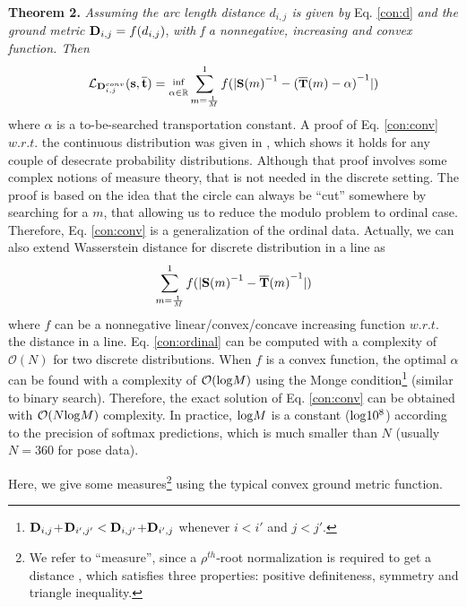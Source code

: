 \textbf{Theorem 2.} \textit{Assuming the arc length distance $d_{i,j}$ is given by} Eq. \eqref{con:d} \textit{and the ground metric} ${{\rm\textbf{D}}_{i,j}}=f(d_{i,j})$, \textit{with f a nonnegative, increasing and convex function. Then} \begin{equation}
\mathcal{L}_{{\rm\textbf{D}}^{conv}_{i,j}}{(\rm{{\textbf{s},\overline{\textbf{t}}}})=\mathop{}_{\alpha\in\mathbb{R}}^{inf}}\sum_{m=\frac{1}{M}}^{1} f(|{{\rm\small{\textbf{S}}}(m)}^{-1}-{({\rm\small\overline{\textbf{T}}}(m)-\alpha)}^{-1}|)\label{con:conv}  
\end{equation} where $\alpha$ is a to-be-searched transportation constant. A proof of Eq. \eqref{con:conv} $w.r.t.$ the continuous distribution was given in \cite{delon2010fast}, which shows it holds for any couple of desecrate probability distributions. Although that proof involves some complex notions of measure theory, that is not needed in the discrete setting. The proof is based on the idea that the circle can always be ``cut'' somewhere by searching for a $m$, that allowing us to reduce the modulo problem \cite{cha2002measuring} to ordinal case. Therefore, Eq. \eqref{con:conv} is a generalization of the ordinal data. Actually, we can also extend Wasserstein distance for discrete distribution in a line \cite{villani2003topics} as \begin{equation}\sum_{m=\frac{1}{M}}^{1} f(|{{\rm{\textbf{S}}}(m)}^{-1}-{{\rm\overline{\textbf{T}}}(m)}^{-1}|)\label{con:ordinal} \end{equation} where $f$ can be a nonnegative linear/convex/concave increasing function $w.r.t.$ the distance in a line. Eq. \eqref{con:ordinal} can be computed with a complexity of $\mathcal{O}(N)$ for two discrete distributions. When $f$ is a convex function, the optimal $\alpha$ can be found with a complexity of $\mathcal{O}({\rm log}M)$ using the Monge condition\footnote{${\rm\textbf{D}}_{i,j}$+${\rm\textbf{D}}_{i',j'}<{\rm\textbf{D}}_{i,j'}$+${\rm\textbf{D}}_{i',j}$ whenever $i<i'$ and $j<j'$.} (similar to binary search). Therefore, the exact solution of Eq. \eqref{con:conv} can be obtained with $\mathcal{O}(N{\rm log}M)$ complexity. In practice, $\small {\rm log}M$ is a constant (${\rm log}10^8$) according to the precision of softmax predictions, which is much smaller than $N$ (usually $N=360$ for pose data). 


Here, we give some measures\footnote{We refer to ``measure'', since a $\rho^{th}$-root normalization is required to get a distance \cite{villani2003topics}, which satisfies three properties: positive definiteness, symmetry and triangle inequality.} using the typical convex ground metric function.

